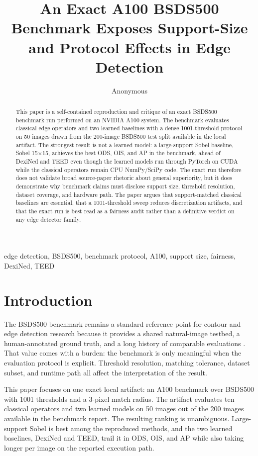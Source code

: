 \documentclass[conference]{IEEEtran}
\title{An Exact A100 BSDS500 Benchmark Exposes Support-Size and Protocol Effects in Edge Detection}
\author{Anonymous}
\begin{document}
\maketitle

\begin{abstract}
This paper is a self-contained reproduction and critique of an exact BSDS500 benchmark run performed on an NVIDIA A100 system. The benchmark evaluates classical edge operators and two learned baselines with a dense 1001-threshold protocol on 50 images drawn from the 200-image BSDS500 test split available in the local artifact. The strongest result is not a learned model: a large-support Sobel baseline, Sobel 15$\times$15, achieves the best ODS, OIS, and AP in the benchmark, ahead of DexiNed and TEED even though the learned models run through PyTorch on CUDA while the classical operators remain CPU NumPy/SciPy code. The exact run therefore does not validate broad source-paper rhetoric about general superiority, but it does demonstrate why benchmark claims must disclose support size, threshold resolution, dataset coverage, and hardware path. The paper argues that support-matched classical baselines are essential, that a 1001-threshold sweep reduces discretization artifacts, and that the exact run is best read as a fairness audit rather than a definitive verdict on any edge detector family.
\end{abstract}

\begin{IEEEkeywords}
edge detection, BSDS500, benchmark protocol, A100, support size, fairness, DexiNed, TEED
\end{IEEEkeywords}

\section{Introduction}
The BSDS500 benchmark remains a standard reference point for contour and edge detection research because it provides a shared natural-image testbed, a human-annotated ground truth, and a long history of comparable evaluations \cite{bsdsweb,arbelaez2011}. That value comes with a burden: the benchmark is only meaningful when the evaluation protocol is explicit. Threshold resolution, matching tolerance, dataset subset, and runtime path all affect the interpretation of the result.

This paper focuses on one exact local artifact: an A100 benchmark over BSDS500 with 1001 thresholds and a 3-pixel match radius. The artifact evaluates ten classical operators and two learned models on 50 images out of the 200 images available in the benchmark report. The resulting ranking is unambiguous. Large-support Sobel is best among the reproduced methods, and the two learned baselines, DexiNed and TEED, trail it in ODS, OIS, and AP while also taking longer per image on the reported execution path.
\end{document}
